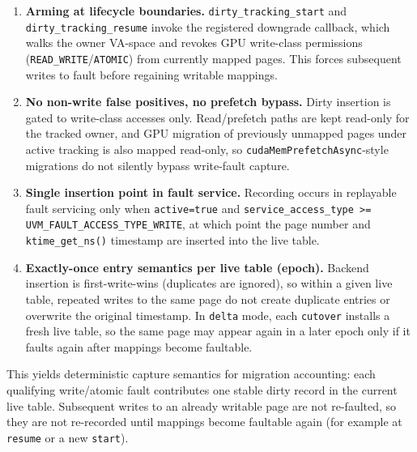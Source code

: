 \begin{enumerate}
    \item \textbf{Arming at lifecycle boundaries.}
          \texttt{dirty\_tracking\_start} and \texttt{dirty\_tracking\_resume}
          invoke the registered downgrade callback, which walks the owner
          VA-space and revokes GPU write-class permissions
          (\texttt{READ\_WRITE}/\texttt{ATOMIC}) from currently mapped pages.
          This forces subsequent writes to fault before regaining writable
          mappings.

    \item \textbf{No non-write false positives, no prefetch bypass.}
          Dirty insertion is gated to write-class accesses only. Read/prefetch
          paths are kept read-only for the tracked owner, and GPU migration of
          previously unmapped pages under active tracking is also mapped
          read-only, so \texttt{cudaMemPrefetchAsync}-style migrations do not
          silently bypass write-fault capture.

    \item \textbf{Single insertion point in fault service.}
          Recording occurs in replayable fault servicing only when
          \texttt{active=true} and
          \texttt{service\_access\_type >= UVM\_FAULT\_ACCESS\_TYPE\_WRITE},
          at which point the page number and \texttt{ktime\_get\_ns()} timestamp
          are inserted into the live table.

    \item \textbf{Exactly-once entry semantics per live table (epoch).}
          Backend insertion is first-write-wins (duplicates are ignored), so
          within a given live table, repeated writes to the same page do not
          create duplicate entries or overwrite the original timestamp. In
          \texttt{delta} mode, each \texttt{cutover} installs a fresh live table,
          so the same page may appear again in a later epoch only if it faults
          again after mappings become faultable.
\end{enumerate}

This yields deterministic capture semantics for migration accounting: each
qualifying write/atomic fault contributes one stable dirty record in the
current live table. Subsequent writes to an already writable page are not
re-faulted, so they are not re-recorded until mappings become faultable again
(for example at \texttt{resume} or a new \texttt{start}).

\vspace{0.5em}


